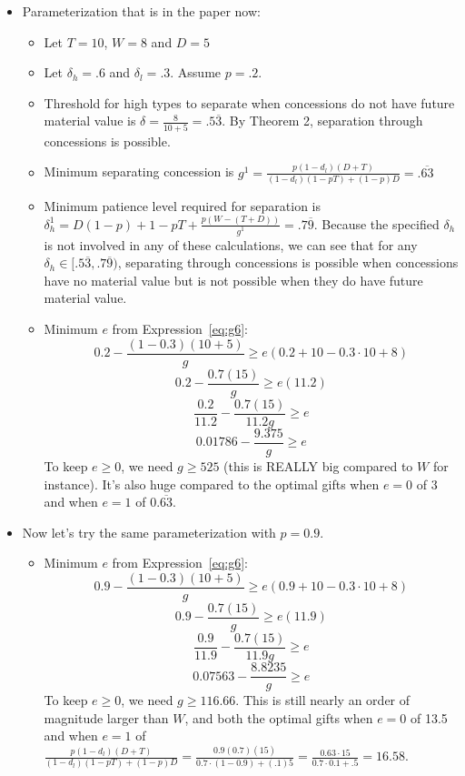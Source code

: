 \documentclass[12pt]{article}
\newcommand{\de}{\delta}
\begin{document}
\begin{itemize}
\begin{itemize}
\begin{itemize}
								\item Parameterization that is in the paper now:
									\begin{itemize}
										\item Let $T = 10$, $W=8$ and $D = 5$
										\item Let $\de_h = .6$ and $\de_l = .3$. Assume $p = .2$. 
										\item Threshold for high types to separate when concessions do not have future material value is $\de = \frac{8}{10+5} = .5\overline{3}$. By Theorem 2, separation through concessions is possible.
										\item Minimum separating concession is $g^1 = \frac{p(1-d_l)(D+T)}{(1-d_l)(1-pT)+(1-p)D} = .\overline{63}$
										\item Minimum patience level required for separation is $\de_h^1 = D(1-p)+1-pT + \frac{p(W-(T+D))}{g^1} = .7\overline{9}.$ Because the specified $\de_h$ is not involved in any of these calculations, we can see that for any $\de_h \in [.5\overline{3},.7\overline{9})$, separating through concessions is possible when concessions have no material value but is not possible when they do have future material value.
										\item Minimum $e$ from Expression~\ref{eq:g6}:
											\[
											  0.2 - \frac{\left(1 - 0.3 \right) \left( 10 + 5 \right)}{g} \geq e \left( 0.2 + 10 - 0.3\cdot 10 + 8 \right)
											\]
											\[
											  0.2 - \frac{0.7 \left( 15 \right)}{g} \geq e \left( 11.2 \right)
											\]
											\[
											  \frac{0.2}{11.2} - \frac{0.7 \left( 15 \right)}{11.2g} \geq e 
											\]
											\[
											  0.01786 - \frac{9.375}{g} \geq e 
											\]
										To keep $e \geq 0$, we need $g \geq 525$ (this is REALLY big compared to $W$ for instance). It's also huge compared to the optimal gifts when $e=0$ of 3 and when $e=1$ of $0.\overline{63}$.
									\end{itemize}
								\item Now let's try the same parameterization with $p=0.9$.
									\begin{itemize}
										\item Minimum $e$ from Expression~\ref{eq:g6}:
											\[
											  0.9 - \frac{\left(1 - 0.3 \right) \left( 10 + 5 \right)}{g} \geq e \left( 0.9 + 10 - 0.3\cdot 10 + 8 \right)
											\]
											\[
											  0.9 - \frac{0.7 \left( 15 \right)}{g} \geq e \left( 11.9 \right)
											\]
											\[
											  \frac{0.9}{11.9} - \frac{0.7 \left( 15 \right)}{11.9g} \geq e 
											\]
											\[
											  0.07563 - \frac{8.8235}{g} \geq e 
											\]
										To keep $e \geq 0$, we need $g \geq 116.66$. This is still nearly an order of magnitude larger than $W$, and both the optimal gifts when $e=0$ of 13.5 and when $e=1$ of $\frac{p(1-d_l)(D+T)}{(1-d_l)(1-pT)+(1-p)D} = \frac{0.9(0.7)(15)}{0.7 \cdot (1-0.9)+(.1)5} = \frac{0.63\cdot15}{0.7 \cdot 0.1+.5} = 16.58$.
									\end{itemize}
							\end{itemize}
						

\end{itemize}
\end{itemize}
\end{document}
